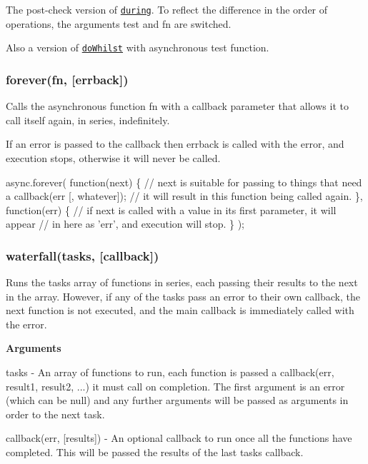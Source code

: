 The post-\/check version of \href{#during}{\tt {\ttfamily during}}. To reflect the difference in the order of operations, the arguments {\ttfamily test} and {\ttfamily fn} are switched.

Also a version of \href{#doWhilst}{\tt {\ttfamily do\+Whilst}} with asynchronous {\ttfamily test} function. 



\label{_forever}%
 \subsubsection*{forever(fn, \mbox{[}errback\mbox{]})}

Calls the asynchronous function {\ttfamily fn} with a callback parameter that allows it to call itself again, in series, indefinitely.

If an error is passed to the callback then {\ttfamily errback} is called with the error, and execution stops, otherwise it will never be called.


\begin{DoxyCode}
async.forever(
    function(next) \{
        // next is suitable for passing to things that need a callback(err [, whatever]);
        // it will result in this function being called again.
    \},
    function(err) \{
        // if next is called with a value in its first parameter, it will appear
        // in here as 'err', and execution will stop.
    \}
);
\end{DoxyCode}
 



\label{_waterfall}%
 \subsubsection*{waterfall(tasks, \mbox{[}callback\mbox{]})}

Runs the {\ttfamily tasks} array of functions in series, each passing their results to the next in the array. However, if any of the {\ttfamily tasks} pass an error to their own callback, the next function is not executed, and the main {\ttfamily callback} is immediately called with the error.

{\bfseries Arguments}


\begin{DoxyItemize}
\item {\ttfamily tasks} -\/ An array of functions to run, each function is passed a {\ttfamily callback(err, result1, result2, ...)} it must call on completion. The first argument is an error (which can be {\ttfamily null}) and any further arguments will be passed as arguments in order to the next task.
\item {\ttfamily callback(err, \mbox{[}results\mbox{]})} -\/ An optional callback to run once all the functions have completed. This will be passed the results of the last task\textquotesingle{}s callback.
\end{DoxyItemize}

